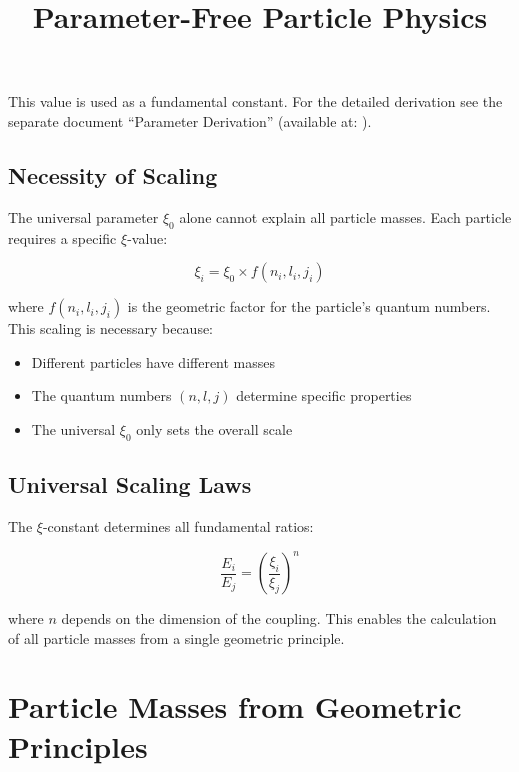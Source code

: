 \documentclass[12pt,a4paper]{report}
\begin{document}
\begin{important}
	This value is used as a fundamental constant. For the detailed derivation 
	see the separate document ``Parameter Derivation'' 
	(available at: ).
\end{important}

\subsection{Necessity of Scaling}

The universal parameter $\xi_0$ alone cannot explain all particle masses. Each particle requires a specific $\xi$-value:

\begin{equation}
	\xi_i = \xi_0 \times f(n_i, l_i, j_i)
\end{equation}

where $f(n_i, l_i, j_i)$ is the geometric factor for the particle's quantum numbers. This scaling is necessary because:

\begin{itemize}
	\item Different particles have different masses
	\item The quantum numbers $(n, l, j)$ determine specific properties
	\item The universal $\xi_0$ only sets the overall scale
\end{itemize}

\subsection{Universal Scaling Laws}

The $\xi$-constant determines all fundamental ratios:

\begin{equation}
	\frac{E_i}{E_j} = \left(\frac{\xi_i}{\xi_j}\right)^n
\end{equation}

where $n$ depends on the dimension of the coupling. This enables the calculation of all particle masses from a single geometric principle.
	\title{Parameter-Free Particle Physics}
\maketitle
	
	\section{Particle Masses from Geometric Principles}
	
\end{document}
